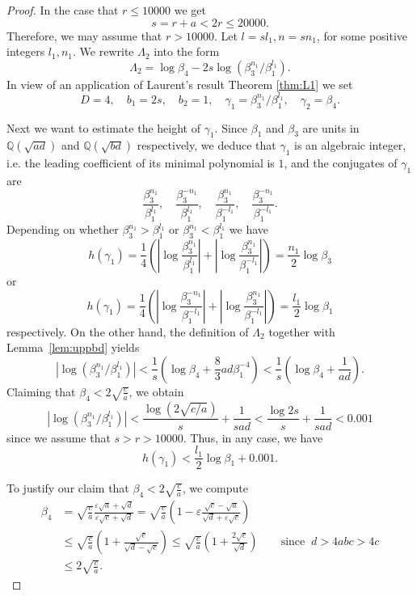 \documentclass{amsart}
\theoremstyle{definition}
\def\QQ{\mathbb Q}
\begin{document}
\begin{proof}
In the case that $r\leq 10000$ we get 
$$s=r+a< 2r\leq 20000.$$
Therefore, we may assume that $r>10000$. Let $l=sl_1, n=sn_1$, for some positive integers $l_1,n_1$. We rewrite $\Lambda_2$ into the form
$$
\Lambda_2= \log\beta_4-2s\log \left({\beta_3^{n_1}}/{\beta_1^{l_1}}\right).
$$
In view of an application of Laurent's result Theorem \ref{thm:L1} we set 
$$D=4,\quad b_1=2s, \quad b_2=1, \quad  \gamma_1= {\beta_3^{n_1}}/{\beta_1^{l_1}}, \quad \gamma_2 = \beta_4.$$

 Next we want to estimate the height of $\gamma_1$. Since $\beta_1$ and $\beta_3$ are units in $\QQ(\sqrt{ad})$ and $\QQ(\sqrt{bd})$ respectively, we deduce that
$\gamma_1$ is an algebraic integer, i.e. the leading coefficient of its minimal polynomial is $1$, and 
the conjugates of $\gamma_1$ are
$$\frac{\beta_3^{n_1}}{\beta_1^{l_1}},\quad \frac{\beta_3^{-n_1}}{\beta_1^{l_1}},
\quad \frac{\beta_3^{n_1}}{\beta_1^{-l_1}},\quad \frac{\beta_3^{-n_1}}{\beta_1^{-l_1}}. $$
Depending on whether ${\beta_3^{n_1}}>{\beta_1^{l_1}}$ or ${\beta_3^{n_1}}<{\beta_1^{l_1}}$ we have
$$h(\gamma_1) = \frac 14\left(\left|\log \frac{\beta_3^{n_1}}{\beta_1^{l_1}}\right|+\left|\log\frac{\beta_3^{n_1}}{\beta_1^{-l_1}}\right|\right)=
\frac{n_1}{2}\log \beta_3$$
or
$$h(\gamma_1) = \frac 14\left(\left|\log \frac{\beta_3^{-n_1}}{\beta_1^{-l_1}}\right|+\left|\log\frac{\beta_3^{n_1}}{\beta_1^{-l_1}}\right|\right)=
\frac{l_1}{2}\log \beta_1$$
respectively. On the other hand, the definition of $\Lambda_2$ together with Lemma~\ref{lem:uppbd} yields
$$
\left|\log \left({\beta_3^{n_1}}/{\beta_1^{l_1}}\right)\right| < \frac{1}{s}\left(\log\beta_4 + \frac{8}{3}ad\beta_1^{-4}\right)
<\frac{1}{s}\left(\log\beta_4+\frac{1}{ad}\right).$$
Claiming that $\beta_4<2\sqrt{\frac ca}$, we obtain
$$
\left|\log \left({\beta_3^{n_1}}/{\beta_1^{l_1}}\right)\right| < \frac{\log \left(2\sqrt{c/a}\right)}s+\frac{1}{sad}<\frac{\log 2s}s+\frac{1}{sad}<0.001
$$
since we assume that $s>r>10000$. Thus, in any case, we have  
$$
h(\gamma_1) <\frac{l_1}{2}\log \beta_1 +0.001. 
$$

To justify our claim that $\beta_4<2\sqrt{\frac ca}$, we compute
\begin{align*}
 \beta_4 &= \sqrt{\frac ca}\frac{\varepsilon\sqrt{a}+\sqrt{d}}{\varepsilon\sqrt{c}+\sqrt{d}}
 = \sqrt{\frac ca} \left(1-\varepsilon\frac{\sqrt{c}-\sqrt{a}}{\sqrt{d}+\varepsilon\sqrt{c}}\right)\\
 &\leq \sqrt{\frac ca} \left(1+\frac{\sqrt{c}}{\sqrt{d}-\sqrt{c}}\right)
 \leq \sqrt{\frac ca} \left(1+\frac{2\sqrt{c}}{\sqrt{d}}\right) \qquad \text{since}\;\; d>4abc>4c\\
 &\leq 2\sqrt{\frac ca}. 
\end{align*}


\end{proof}
\end{document}
